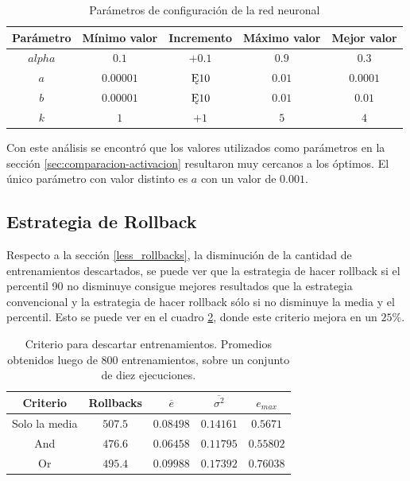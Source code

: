 \documentclass[a4paper,10pt]{article}
\begin{document}
        \begin{table}[H]
            \begin{tabular}{|c|c|c|c|c|}
                \hline
                Parámetro & Mínimo valor & Incremento & Máximo valor & Mejor valor \\ \hline
                $alpha$ & $0.1$ & $+ 0.1$ & $0.9$ & $0.3$ \\ \hline
                $a$ & $0.00001$ & $\Cross 10$ & $0.01$ & $0.0001$ \\ \hline
                $b$ & $0.00001$ & $\Cross 10$ & $0.01$ & $0.01$ \\ \hline
                $k$ & $1$ & $+ 1$ & $5$ & $4$ \\ \hline
            \end{tabular}
            \caption{Parámetros de configuración de la red neuronal}
            \label{tabla_configuracion}
        \end{table}

        Con este análisis se encontró que los valores utilizados como parámetros
        en la sección \ref{sec:comparacion-activacion} resultaron muy cercanos a
        los óptimos.
        El único parámetro con valor distinto es $a$ con un valor de $0.001$.

    \subsection{Estrategia de Rollback}

        Respecto a la sección \ref{less_rollbacks}, la disminución de la cantidad de entrenamientos descartados, se puede ver que la estrategia de hacer rollback si el percentil 90 no disminuye consigue mejores resultados que la estrategia convencional y la estrategia de hacer rollback sólo si no disminuye la media y el percentil. Esto se puede ver en el cuadro \ref{tabla_rollbacks}, donde este criterio mejora en un $25\%$.

    \begin{table}[H]
        \begin{tabular}{|c|c|c|c|c|}
        \hline
        Criterio & Rollbacks & $\overline{e}$ & $\overline{\sigma^2}$ & ${e}_{max} $ \\ \hline
        Solo la media & $507.5$ & $0.08498$ & $0.14161$ & $0.5671$ \\ \hline
        And & $476.6$ & $0.06458$ & $0.11795$ & $0.55802$ \\ \hline
        Or & $495.4$ & $0.09988$ & $0.17392$ & $0.76038$ \\ \hline
        \end{tabular}
        \caption{Criterio para descartar entrenamientos. Promedios obtenidos luego de 800 entrenamientos, sobre un conjunto de diez ejecuciones.}
        \label{tabla_rollbacks}
    \end{table}
\end{document}
